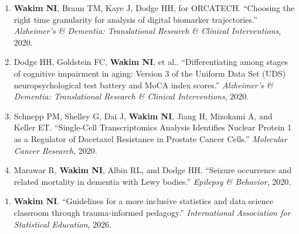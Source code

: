 

\begin{enumerate}
\item \textbf{Wakim NI}, Braun TM, Kaye J, Dodge HH, for ORCATECH. ``Choosing the right time granularity for analysis of digital biomarker trajectories.'' \textit{Alzheimer's \& Dementia: Translational Research \& Clinical Interventions}, 2020.
\item Dodge HH, Goldstein FC, \textbf{Wakim NI}, et al.. ``Differentiating among stages of cognitive impairment in aging: Version 3 of the Uniform Data Set (UDS) neuropsychological test battery and MoCA index scores.'' \textit{Alzheimer's \& Dementia: Translational Research \& Clinical Interventions}, 2020.
\item Schnepp PM, Shelley G, Dai J, \textbf{Wakim NI}, Jiang H, Mizokami A, and Keller ET. ``Single-Cell Transcriptomics Analysis Identifies Nuclear Protein 1 as a Regulator of Docetaxel Resistance in Prostate Cancer Cells.'' \textit{Molecular Cancer Research}, 2020.
\item Marawar R, \textbf{Wakim NI}, Albin RL, and Dodge HH. ``Seizure occurrence and related mortality in dementia with Lewy bodies.'' \textit{Epilepsy \& Behavior}, 2020.
\end{enumerate}


\begin{enumerate}
\item \textbf{Wakim NI}. ``Guidelines for a more inclusive statistics and data science classroom through trauma-informed pedagogy.'' \textit{International Association for Statistical Education}, 2026.
\end{enumerate}
